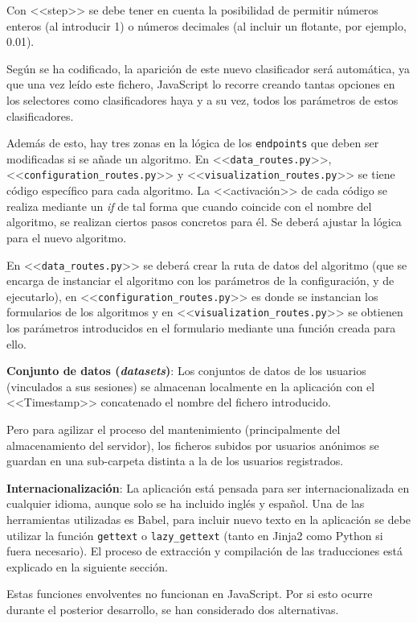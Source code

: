 Con <<step>> se debe tener en cuenta la posibilidad de permitir números enteros
(al introducir 1) o números decimales (al incluir un flotante, por ejemplo,
0.01).

Según se ha codificado, la aparición de este nuevo clasificador será automática,
ya que una vez leído este fichero, JavaScript lo recorre creando tantas opciones
en los selectores como clasificadores haya y a su vez, todos los parámetros de
estos clasificadores.

Además de esto, hay tres zonas en la lógica de los \texttt{endpoints} que deben
ser modificadas si se añade un algoritmo. En <<\texttt{data\_routes.py}>>,
<<\texttt{configuration\_routes.py}>> y <<\texttt{visualization\_routes.py}>> se
tiene código específico para cada algoritmo. La <<activación>> de cada código se
realiza mediante un \textit{if} de tal forma que cuando coincide con el nombre
del algoritmo, se realizan ciertos pasos concretos para él. Se deberá ajustar la
lógica para el nuevo algoritmo.

En <<\texttt{data\_routes.py}>> se deberá crear la ruta de datos del algoritmo
(que se encarga de instanciar el algoritmo con los parámetros de la
configuración, y de ejecutarlo), en <<\texttt{configuration\_routes.py}>> es
donde se instancian los formularios de los algoritmos y en
<<\texttt{visualization\_routes.py}>> se obtienen los parámetros introducidos en
el formulario mediante una función creada para ello.

\textbf{Conjunto de datos (\textit{datasets})}: Los conjuntos de datos de los
usuarios (vinculados a sus sesiones) se almacenan localmente en la aplicación
con el <<Timestamp>> concatenado el nombre del fichero introducido.

Pero para agilizar el proceso del mantenimiento (principalmente del
almacenamiento del servidor), los ficheros subidos por usuarios anónimos se
guardan en una sub-carpeta distinta a la de los usuarios registrados.

\textbf{Internacionalización}: La aplicación está pensada para ser
internacionalizada en cualquier idioma, aunque solo se ha incluido inglés y
español. Una de las herramientas utilizadas es Babel, para incluir nuevo texto
en la aplicación se debe utilizar la función \texttt{gettext} o
\texttt{lazy\_gettext} (tanto en Jinja2 como Python si fuera necesario). El
proceso de extracción y compilación de las traducciones está explicado en la
siguiente sección.

Estas funciones envolventes no funcionan en JavaScript. Por si esto ocurre
durante el posterior desarrollo, se han considerado dos alternativas. 

